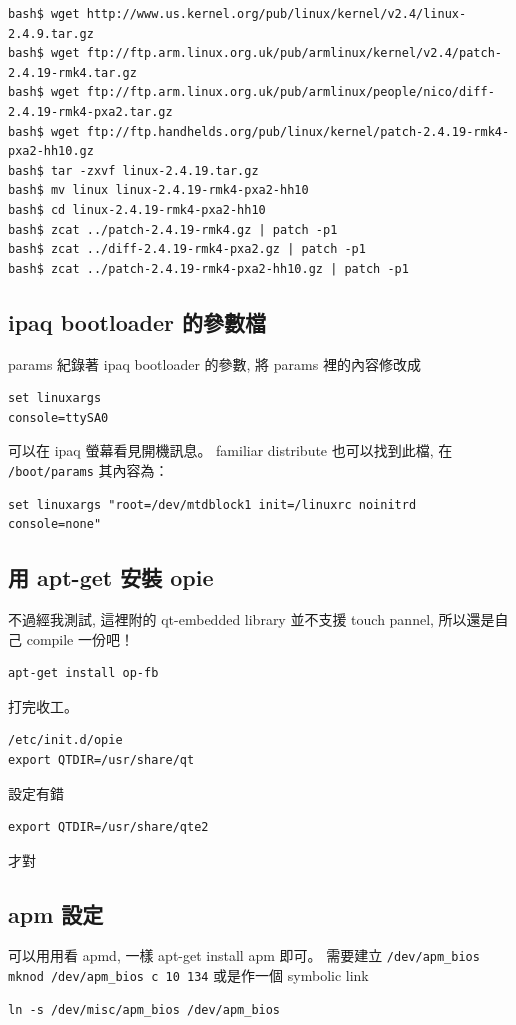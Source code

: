 \documentclass[12pt,a4paper]{article}
\begin{document}
\begin{CJK}{UTF8}{bsmi}
\begin{verbatim}
bash$ wget http://www.us.kernel.org/pub/linux/kernel/v2.4/linux-2.4.9.tar.gz
bash$ wget ftp://ftp.arm.linux.org.uk/pub/armlinux/kernel/v2.4/patch-2.4.19-rmk4.tar.gz
bash$ wget ftp://ftp.arm.linux.org.uk/pub/armlinux/people/nico/diff-2.4.19-rmk4-pxa2.tar.gz
bash$ wget ftp://ftp.handhelds.org/pub/linux/kernel/patch-2.4.19-rmk4-pxa2-hh10.gz
bash$ tar -zxvf linux-2.4.19.tar.gz
bash$ mv linux linux-2.4.19-rmk4-pxa2-hh10
bash$ cd linux-2.4.19-rmk4-pxa2-hh10
bash$ zcat ../patch-2.4.19-rmk4.gz | patch -p1
bash$ zcat ../diff-2.4.19-rmk4-pxa2.gz | patch -p1
bash$ zcat ../patch-2.4.19-rmk4-pxa2-hh10.gz | patch -p1
\end{verbatim}


\subsection{ipaq bootloader 的參數檔}
params 紀錄著 ipaq bootloader 的參數,
將 params 裡的內容修改成

\begin{verbatim}
set linuxargs
console=ttySA0
\end{verbatim}

可以在 ipaq 螢幕看見開機訊息。
familiar distribute 也可以找到此檔, 在 \verb+/boot/params+
其內容為：
\begin{verbatim}
set linuxargs "root=/dev/mtdblock1 init=/linuxrc noinitrd console=none"
\end{verbatim}

\subsection{用 apt-get 安裝 opie}
不過經我測試, 這裡附的 qt-embedded library 並不支援 touch pannel,
所以還是自己 compile 一份吧！
\begin{verbatim}
apt-get install op-fb
\end{verbatim}
打完收工。
\begin{verbatim}
/etc/init.d/opie
export QTDIR=/usr/share/qt
\end{verbatim}
設定有錯
\begin{verbatim}
export QTDIR=/usr/share/qte2
\end{verbatim}
才對

\subsection{apm 設定}
可以用用看 apmd, 一樣 apt-get install apm 即可。
需要建立 \verb+/dev/apm_bios+
\verb+mknod /dev/apm_bios c 10 134+
或是作一個 symbolic link
\begin{verbatim}
ln -s /dev/misc/apm_bios /dev/apm_bios
\end{verbatim}


\end{CJK}
\end{document}
